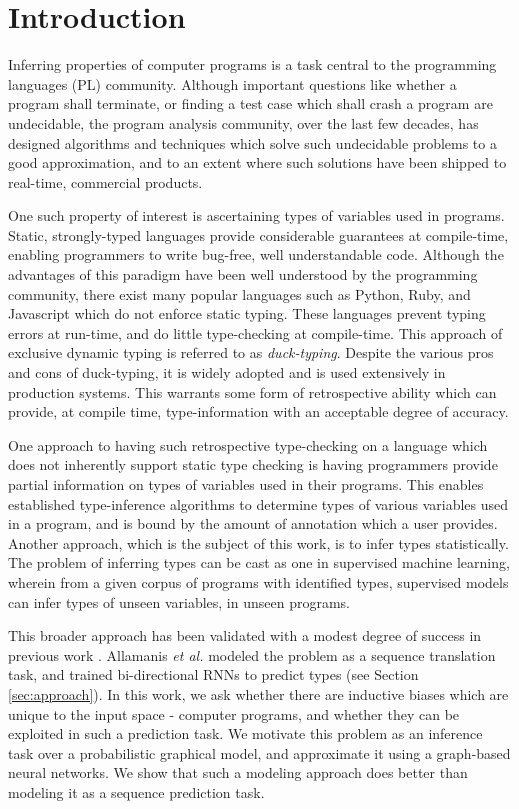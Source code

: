 \section{Introduction}
\label{sec:introduction}
Inferring properties of computer programs is a task central to the programming languages (PL) community. Although important questions like whether a program shall terminate, or finding a test case which shall crash a program are undecidable, the program analysis community, over the last few decades, has designed algorithms and techniques which solve such undecidable problems to a good approximation, and to an extent where such solutions have been shipped to real-time, commercial products.

One such property of interest is ascertaining types of variables used in programs. Static, strongly-typed languages provide considerable guarantees at compile-time, enabling programmers to write bug-free, well understandable code. Although the advantages of this paradigm have been well understood by the programming community, there exist many popular languages such as Python, Ruby, and Javascript which do not enforce static typing. These languages prevent typing errors at run-time, and do little type-checking at compile-time. This approach of exclusive dynamic typing is referred to as \textit{duck-typing}. Despite the various pros and cons of duck-typing, it is widely adopted and is used extensively in production systems. This warrants some form of retrospective ability which can provide, at compile time, type-information with an acceptable degree of accuracy.

One approach to having such retrospective type-checking on a language which does not inherently support static type checking is having programmers provide partial information on types of variables used in their programs. This enables established type-inference algorithms to determine types of various variables used in a program, and is bound by the amount of annotation which a user provides. Another approach, which is the subject of this work, is to infer types statistically. The problem of inferring types can be cast as one in supervised machine learning, wherein from a given corpus of programs with identified types, supervised models can infer types of unseen variables, in unseen programs.

This broader approach has been validated with a modest degree of success in previous work \cite{hellendoorn2018deep}. Allamanis \textit{et al.} modeled the problem as a sequence translation task, and trained bi-directional RNNs to predict types (see Section \ref{sec:approach}). In this work, we ask whether there are inductive biases which are unique to the input space - computer programs, and whether they can be exploited in such a prediction task. We motivate this problem as an inference task over a probabilistic graphical model, and approximate it using a graph-based neural networks. We show that such a modeling approach does better than modeling it as a sequence prediction task.


